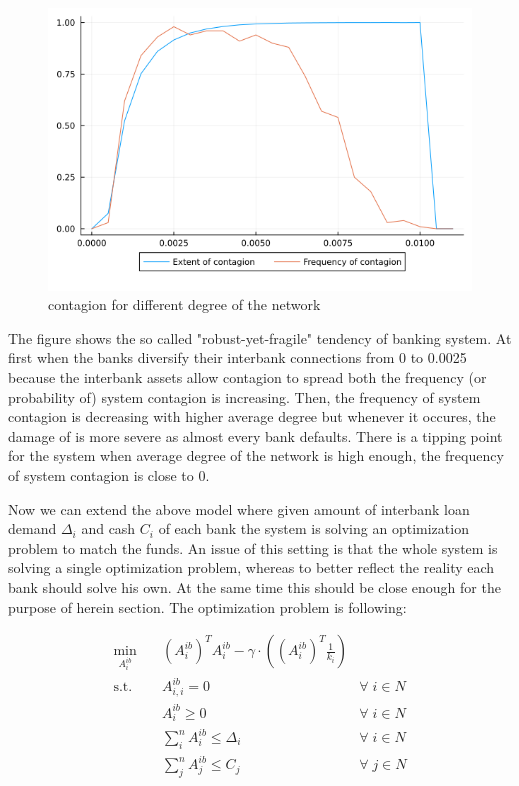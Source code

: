 \documentclass{article}
\begin{document}
\begin{figure}[h]
    \centering
    \includegraphics[scale=0.6]{contagionplot.png}
    \caption{contagion for different degree of the network}
\end{figure}

The figure shows the so called "robust-yet-fragile" tendency of banking system. At first when the banks diversify their interbank connections from 0 to 0.0025 because the interbank assets allow contagion to spread both the frequency (or probability of) system contagion is increasing. Then, the frequency of system contagion is decreasing with higher average degree but whenever it occures, the damage of is more severe as almost every bank defaults. There is a tipping point for the system when average degree of the network is high enough, the frequency of system contagion is close to 0.

Now we can extend the above model where given amount of interbank loan demand $\Delta_i$ and cash $C_i$ of each bank the system is solving an optimization problem to match the funds. An issue of this setting is that the whole system is solving a single optimization problem, whereas to better reflect the reality each bank should solve his own. At the same time this should be close enough for the purpose of herein section. The optimization problem is following:

\begin{equation}
    \begin{aligned}
    \min_{A^{ib}_i} \quad & (A^{ib}_i)^T A^{ib}_i - \gamma \cdot \left((A^{ib}_i)^T \frac{1}{k_i}\right)\\
    \textrm{s.t.} \quad & A^{ib}_{i,i} = 0 & \forall \; i \in N\\
      & A^{ib}_i \geq 0 & \forall \; i \in N\\
      & \sum_i^n A^{ib}_i \leq \Delta_i & \forall \; i \in N\\
      & \sum_j^n A^{ib}_j \leq C_j & \forall \; j \in N\\ 
    \end{aligned}
\end{equation}
\end{document}
